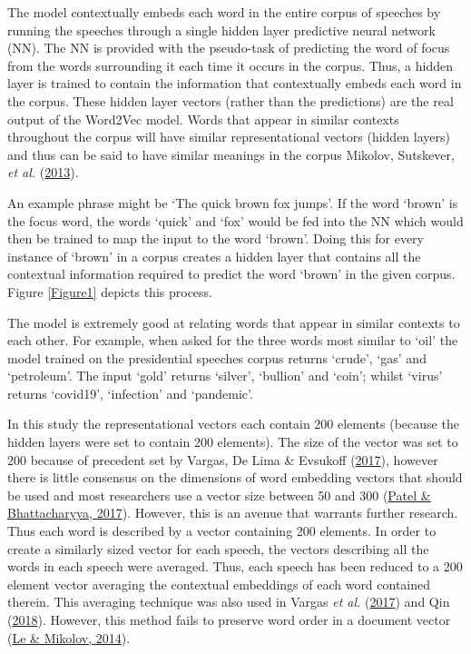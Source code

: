 \documentclass[11pt,preprint, authoryear]{elsarticle}
\numberwithin{equation}{section}
\numberwithin{figure}{section}
\numberwithin{table}{section}
\begin{document}
The model contextually embeds each word in the entire corpus of speeches
by running the speeches through a single hidden layer predictive neural
network (NN). The NN is provided with the pseudo-task of predicting the
word of focus from the words surrounding it each time it occurs in the
corpus. Thus, a hidden layer is trained to contain the information that
contextually embeds each word in the corpus. These hidden layer vectors
(rather than the predictions) are the real output of the Word2Vec model.
Words that appear in similar contexts throughout the corpus will have
similar representational vectors (hidden layers) and thus can be said to
have similar meanings in the corpus Mikolov, Sutskever, \emph{et al.}
(\protect\hyperlink{ref-mikolov2013distributed}{2013}).

An example phrase might be `The quick brown fox jumps'. If the word
`brown' is the focus word, the words `quick' and `fox' would be fed into
the NN which would then be trained to map the input to the word `brown'.
Doing this for every instance of `brown' in a corpus creates a hidden
layer that contains all the contextual information required to predict
the word `brown' in the given corpus. Figure \ref{Figure1} depicts this
process.

The model is extremely good at relating words that appear in similar
contexts to each other. For example, when asked for the three words most
similar to `oil' the model trained on the presidential speeches corpus
returns `crude', `gas' and `petroleum'. The input `gold' returns
`silver', `bullion' and `coin'; whilst `virus' returns `covid19',
`infection' and `pandemic'.

In this study the representational vectors each contain 200 elements
(because the hidden layers were set to contain 200 elements). The size
of the vector was set to 200 because of precedent set by Vargas, De Lima
\& Evsukoff (\protect\hyperlink{ref-vargas2017deep}{2017}), however
there is little consensus on the dimensions of word embedding vectors
that should be used and most researchers use a vector size between 50
and 300 (\protect\hyperlink{ref-patel-bhattacharyya-2017-towards}{Patel
\& Bhattacharyya, 2017}). However, this is an avenue that warrants
further research. Thus each word is described by a vector containing 200
elements. In order to create a similarly sized vector for each speech,
the vectors describing all the words in each speech were averaged. Thus,
each speech has been reduced to a 200 element vector averaging the
contextual embeddings of each word contained therein. This averaging
technique was also used in Vargas \emph{et al.}
(\protect\hyperlink{ref-vargas2017deep}{2017}) and Qin
(\protect\hyperlink{ref-qin230natural}{2018}). However, this method
fails to preserve word order in a document vector
(\protect\hyperlink{ref-le2014distributed}{Le \& Mikolov, 2014}).
\end{document}

